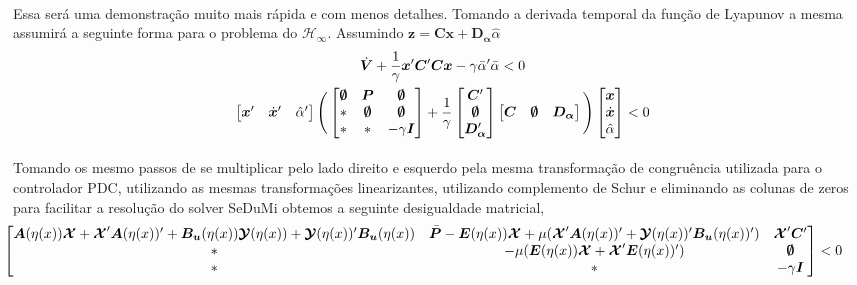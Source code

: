 \documentclass[a4paper,10pt]{article}
\begin{document}
\paragraph{}Essa será uma demonstração muito mais rápida e com menos detalhes. Tomando a derivada temporal da função de Lyapunov a mesma assumirá a seguinte forma para o problema do $\mathcal{H}_\infty$. Assumindo $\bm{z} = \bm{C}\bm{x} + \bm{D_{\alpha}}\hat{\alpha}$
\begin{gather}
\dot{\bm{V}} +\frac{1}{\gamma}\bm{x}'\bm{C}'\bm{C}\bm{x} - \gamma\bar{\alpha}'\bar{\alpha} < 0\\
 \begin{bmatrix}
	\bm{x}' & \dot{\bm{x}}' & \hat{\alpha}'
\end{bmatrix}\Bigg(\begin{bmatrix}
	\bm{\emptyset} & \bm{P} & \bm{\emptyset} \\
	* & \bm{\emptyset} & \bm{\emptyset} \\
	* & * & -\gamma\bm{I}
\end{bmatrix} + \frac{1}{\gamma}\begin{bmatrix}
\bm{C}' \\ \bm{\emptyset} \\ \bm{D_{\alpha}}'
\end{bmatrix}\begin{bmatrix}
\bm{C} & \bm{\emptyset} & \bm{D_{\alpha}}
\end{bmatrix}\Bigg)\begin{bmatrix}
	\bm{x} \\ \dot{\bm{x}} \\ \hat{\alpha}
\end{bmatrix} < 0
\end{gather}
\paragraph{}Tomando os mesmo passos de se multiplicar pelo lado direito e esquerdo pela mesma transformação de congruência utilizada para o controlador PDC, utilizando as mesmas transformações linearizantes, utilizando complemento de Schur e eliminando as colunas de zeros para facilitar a resolução do solver SeDuMi obtemos a seguinte desigualdade matricial,
\small{\begin{gather}
	\hspace{-1cm}\begin{bmatrix}
		\Af\X + \X'\Af' + \Buf\Y + \Y'\Buf & \bar{\bm{P}} - \Ef\X + \mu(\X'\Af' + \Y'\Buf') & \X'\bm{C}' \\
		* & -\mu(\Ef\X + \X'\Ef') & \zero \\
		* & * & -\gamma\bm{I}
	\end{bmatrix}  < 0
\end{gather}}
\end{document}

